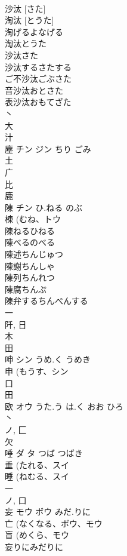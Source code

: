 \documentclass[8pt]{extreport}
\begin{document}
\begin{CJK}{UTF8}{min}
\\	沙汰 [さた] 
\\	淘汰 [とうた] 
\\	淘げるよなげる
\\	淘汰とうた
\\	沙汰さた
\\	沙汰するさたする
\\	ご不沙汰ごぶさた
\\	音沙汰おとさた
\\	表沙汰おもてざた
\\	丶 
\\	大 
\\	汁 
\\	塵	チン ジン	ちり ごみ	
\\	土 
\\	广 
\\	比 
\\	鹿 
\\	陳	チン	ひ.ねる のぶ	
\\	棟 (むね、トウ 
\\	陳ねるひねる
\\	陳べるのべる
\\	陳述ちんじゅつ
\\	陳謝ちんしゃ
\\	陳列ちんれつ
\\	陳腐ちんぷ
\\	陳弁するちんべんする
\\	一 
\\	阡, 日 
\\	木 
\\	田 
\\	呻	シン	うめ.く うめき	
\\	申 (もうす、シン 
\\	口 
\\	田 
\\	欧	オウ	うた.う は.く おお ひろ	
\\	丶 
\\	ノ, 匚 
\\	欠 
\\	唾	ダ タ	つば つばき	
\\	垂 (たれる、スイ 
\\	睡 (ねむる、スイ 
\\	一 
\\	ノ, 口 
\\	妄	モウ ボウ	みだ.りに	
\\	亡 (なくなる、ボウ、モウ 
\\	盲 (めくら、モウ 
\\	妄りにみだりに

\end{CJK}
\end{document}
